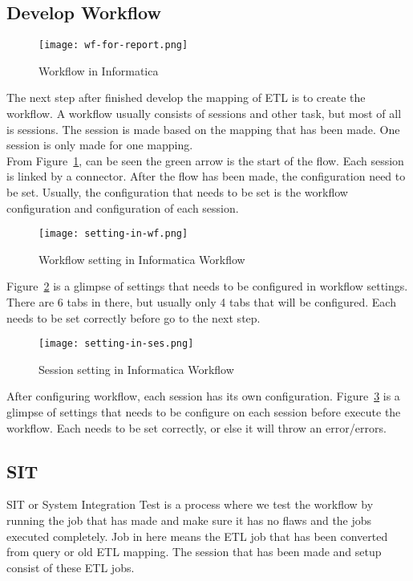 \subsection{Develop Workflow}

\begin{figure}[H]
\centering
\texttt{[image: wf-for-report.png]}
\caption{Workflow in Informatica}
\label{fig:wfinfa}
\end{figure}

The next step after finished develop the mapping of ETL is to create the workflow. A workflow usually consists of sessions and other task, but most of all is sessions. The session is made based on the mapping that has been made. One session is only made for one mapping.\\

From Figure~\ref{fig:wfinfa}, can be seen the green arrow is the start of the flow. Each session is linked by a connector. After the flow has been made, the configuration need to be set. Usually, the configuration that needs to be set is the workflow configuration and configuration of each session.

\begin{figure}[H]
\centering
\texttt{[image: setting-in-wf.png]}
\caption{Workflow setting in Informatica Workflow}
\label{fig:setwf}
\end{figure}

Figure~\ref{fig:setwf} is a glimpse of settings that needs to be configured in workflow settings. There are 6 tabs in there, but usually only 4 tabs that will be configured. Each needs to be set correctly before go to the next step.

\begin{figure}[H]
\centering
\texttt{[image: setting-in-ses.png]}
\caption{Session setting in Informatica Workflow}
\label{fig:setses}
\end{figure}

After configuring workflow, each session has its own configuration. Figure~\ref{fig:setses} is a glimpse of settings that needs to be configure on each session before execute the workflow. Each needs to be set correctly, or else it will throw an error/errors.

\subsection{SIT}
SIT or System Integration Test is a process where we test the workflow by running the job that has made and make sure it has no flaws and the jobs executed completely. Job in here means the ETL job that has been converted from query or old ETL mapping. The session that has been made and setup consist of these ETL jobs.

